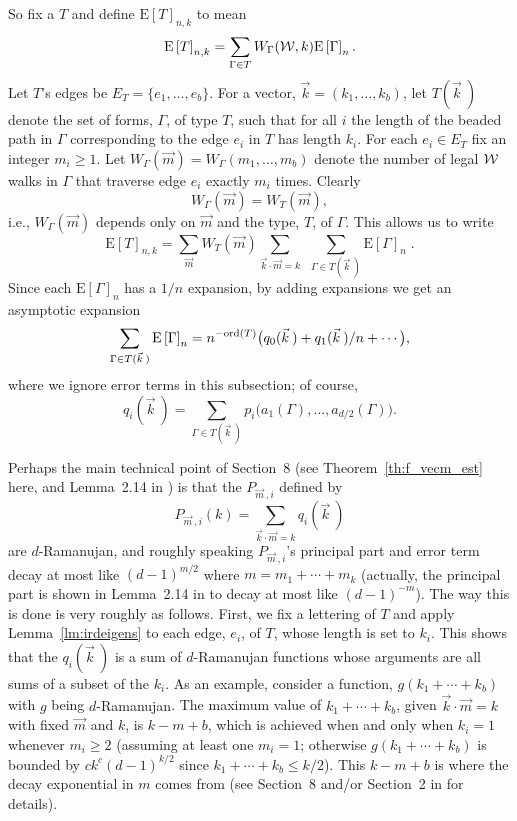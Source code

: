 \documentclass[12pt]{article}
\newcommand{\dtreelike}{{$d$-Ramanujan}}
\newcommand{\cw}{{\cal W}}
\newcommand{\E}[1]{\mbox{E}\left[#1\right] }
\begin{document}
So fix a $T$ and define $\E{T}_{n,k}$ to mean
$$
\E{T}_{n,k} =
\sum_{\Gamma\in T} W_\Gamma(\cw,k)\E{\Gamma}_n.
$$
Let $T$'s edges be $E_T=\{e_1,\ldots,e_b\}$.
For a vector, $\vec k = (k_1,\ldots,k_{b})$, let $T(\vec k\>)$ denote
the set of forms, $\Gamma$,
of type $T$, such that for all $i$ the length of the beaded path in
$\Gamma$ corresponding to the edge $e_i$ in $T$ has length $k_i$.
For each $e_i\in E_T$ fix an integer $m_i\ge 1$.
Let $W_\Gamma(\vec m)=W_\Gamma(m_1,\ldots,m_b)$ 
denote the number of legal $\cw$ walks
in $\Gamma$ that traverse edge $e_i$ exactly $m_i$ times.
Clearly
$$
W_\Gamma(\vec m) = W_T(\vec m),
$$
i.e., $W_\Gamma(\vec m)$ depends only on $\vec m$ and the
type, $T$, of $\Gamma$.  This allows us to write 
$$
\E{T}_{n,k} = \sum_{\vec m} W_T(\vec m) 
\sum_{\vec k \cdot \vec m = k} \ \ 
\sum_{\Gamma\in T(\vec k\>)} \E{\Gamma}_n \;.
$$
Since each $\E{\Gamma}_n$ has a $1/n$ expansion, by adding expansions we
get an asymptotic expansion
$$
\sum_{\Gamma\in T(\vec k\>)} \E{\Gamma}_n =
n^{-{\rm ord}(T)} \bigl( q_0(\vec k\>) + q_1(\vec k\>)/n + \cdots \bigr),
$$
where we ignore error terms in this subsection;
of course,
$$
q_i(\vec k\>) = \sum_{\Gamma\in T(\vec k\>)} 
p_i\bigl( a_1(\Gamma),\ldots,a_{d/2}(\Gamma) \bigr).
$$

Perhaps the main technical point of Section~8 (see Theorem~\ref{th:f_vecm_est}
here, and Lemma~2.14 in \cite{friedman_random_graphs}) is that
the $P_{\vec m\>,i}$ defined by
$$
P_{\vec m\>,i}(k)
=\sum_{\vec k\cdot \vec m=k} q_i(\vec k\>)
$$
are {\dtreelike}, and
roughly speaking $P_{\vec m\>,i}$'s principal part and error term
decay at most like $(d-1)^{m/2}$ where
$m=m_1+\cdots+m_k$ (actually, the principal part is shown
in Lemma~2.14 in \cite{friedman_random_graphs} to decay at most like
$(d-1)^{-m}$).
The way this is done is very roughly as follows.
First, we fix a lettering of $T$ and apply Lemma~\ref{lm:irdeigens}
to each edge, $e_i$, of $T$, whose length is set to $k_i$.
This shows that the $q_i(\vec k\>)$ is a sum of {\dtreelike} functions
whose arguments are all sums of a subset of the $k_i$.  As an example,
consider
a function, $g(k_1+\cdots+k_b)$ with $g$ being {\dtreelike}.  The maximum
value of $k_1+\cdots+k_b$, given $\vec k\cdot\vec m=k$ with fixed
$\vec m$ and $k$, is $k-m+b$, which is achieved when and only when $k_i=1$
whenever $m_i\ge 2$ (assuming at least one $m_i=1$; otherwise
$g(k_1+\cdots+k_b)$ is bounded by 
$ck^c (d-1)^{k/2}$ since $k_1+\cdots+k_b\le k/2$).
This $k-m+b$ is where the decay exponential in $m$ comes from
(see Section~8 and/or Section~2 in \cite{friedman_random_graphs}
for details).
\end{document}
